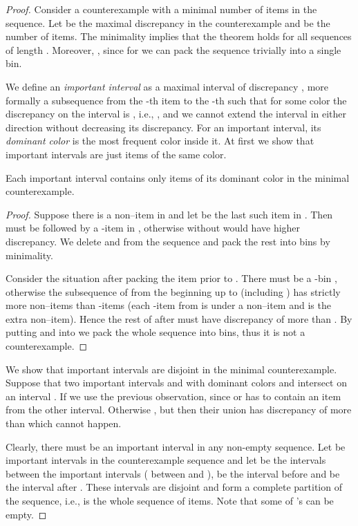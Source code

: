 \documentclass[11pt,a4paper]{article}
\begin{document}
\begin{proof}
Consider a counterexample with a minimal number of items in the sequence.
Let  be the maximal discrepancy in the counterexample
and  be the number of items.
The minimality implies that the theorem holds for all sequences of length .
Moreover, , since for  we can pack the sequence trivially
into a single bin.

We define an \textit{important interval} as a maximal interval of discrepancy ,
more formally a subsequence from the -th item to the -th such that
for some color  the discrepancy on the interval is , i.e., ,
and we cannot extend the interval in either direction without decreasing its discrepancy.
For an important interval, its \textit{dominant color}  is the most frequent color inside
it. At first we show that important intervals are just  items of the same color.

\begin{observation}
Each important interval  contains only  items of its dominant color  in the minimal counterexample.
\end{observation}
\begin{proof}
Suppose there is a non--item in  and let  be the last such item in .
Then  must be followed by a -item  in , otherwise  without  would have higher discrepancy.
We delete  and  from the sequence and pack the rest into  bins by minimality.

Consider the situation after packing the item prior to .
There must be a -bin , otherwise the subsequence of  from the beginning up to  (including )
has strictly more non--items than -items
(each -item from  is under a non--item
and  is the extra non--item).
Hence the rest of  after  must have discrepancy of more than .
By putting  and  into  we pack the whole sequence into  bins,
thus it is not a counterexample.
\end{proof}

We show that important intervals are disjoint in the minimal counterexample.
Suppose that two important intervals  and  with dominant colors  and 
intersect on an interval . If  we use the previous observation,
since  or  has to contain an item from the other interval.
Otherwise , but then their union has discrepancy of more than 
which cannot happen.

Clearly, there must be an important interval in any non-empty sequence.
Let  be important intervals in the counterexample sequence and
let  be the intervals between the important intervals ( between  and ),
 be the interval before  and  be the interval after . 
These intervals are disjoint and form a complete partition of the sequence, i.e.,
  is the whole sequence of items.
Note that some of 's can be empty.


\end{proof}
\end{document}
